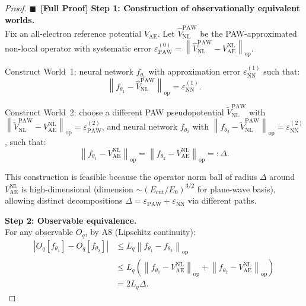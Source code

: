 \documentclass[11pt,a4paper]{article}
\theoremstyle{definition}
\newcommand{\rigorFull}[0]{$\blacksquare$~\textbf{[Full Proof]}}
\newcommand{\norm}[1]{\left\lVert#1\right\rVert}
\begin{document}
\begin{proof}\rigorFull
\textbf{Step 1: Construction of observationally equivalent worlds.}\\
Fix an all-electron reference potential $V_{\mathrm{AE}}$. Let $\hat{V}_{\mathrm{NL}}^{\mathrm{PAW}}$ be the PAW-approximated non-local operator with systematic error $\varepsilon_{\mathrm{PAW}}^{(0)} = \norm{\hat{V}_{\mathrm{NL}}^{\mathrm{PAW}} - V_{\mathrm{AE}}^{\mathrm{NL}}}_{\mathrm{op}}$.

Construct World~1: neural network $f_{\theta_1}$ with approximation error $\varepsilon_{\mathrm{NN}}^{(1)}$ such that:
\begin{equation}
\norm{f_{\theta_1} - \hat{V}_{\mathrm{NL}}^{\mathrm{PAW}}}_{\mathrm{op}} = \varepsilon_{\mathrm{NN}}^{(1)}.
\end{equation}

Construct World~2: choose a different PAW pseudopotential $\tilde{V}_{\mathrm{NL}}^{\mathrm{PAW}}$ with $\norm{\tilde{V}_{\mathrm{NL}}^{\mathrm{PAW}} - V_{\mathrm{AE}}^{\mathrm{NL}}}_{\mathrm{op}} = \varepsilon_{\mathrm{PAW}}^{(2)}$, and neural network $f_{\theta_2}$ with $\norm{f_{\theta_2} - \tilde{V}_{\mathrm{NL}}^{\mathrm{PAW}}}_{\mathrm{op}} = \varepsilon_{\mathrm{NN}}^{(2)}$, such that:
\begin{equation}\label{eq:construction}
\norm{f_{\theta_1} - V_{\mathrm{AE}}^{\mathrm{NL}}}_{\mathrm{op}} = \norm{f_{\theta_2} - V_{\mathrm{AE}}^{\mathrm{NL}}}_{\mathrm{op}} =: \Delta.
\end{equation}

This construction is feasible because the operator norm ball of radius $\Delta$ around $V_{\mathrm{AE}}^{\mathrm{NL}}$ is high-dimensional (dimension $\sim (E_{\mathrm{cut}}/E_0)^{3/2}$ for plane-wave basis), allowing distinct decompositions $\Delta = \varepsilon_{\mathrm{PAW}} + \varepsilon_{\mathrm{NN}}$ via different paths.

\textbf{Step 2: Observable equivalence.}\\
For any observable $O_q$, by A8 (Lipschitz continuity):
\begin{align}
|O_q[f_{\theta_1}] - O_q[f_{\theta_2}]| &\leq L_q \norm{f_{\theta_1} - f_{\theta_2}}_{\mathrm{op}} \\
&\leq L_q \left(\norm{f_{\theta_1} - V_{\mathrm{AE}}^{\mathrm{NL}}}_{\mathrm{op}} + \norm{f_{\theta_2} - V_{\mathrm{AE}}^{\mathrm{NL}}}_{\mathrm{op}}\right) \\
&= 2L_q \Delta.
\end{align}


\end{proof}
\end{document}

